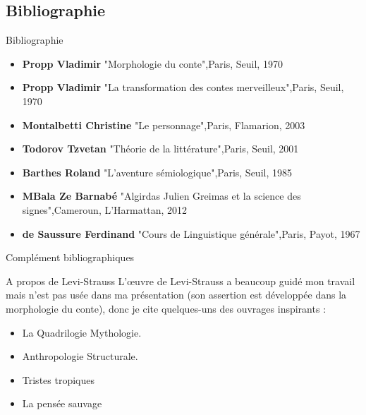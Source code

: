 \documentclass{beamer}
\begin{document}
\subsection{Bibliographie}
\begin{frame}{Bibliographie}
  \scriptsize
  \begin{itemize}
    \item \textbf{Propp Vladimir} "Morphologie du conte",\newline Paris, Seuil, 1970
    \item \textbf{Propp Vladimir} "La transformation des contes merveilleux",\newline Paris, Seuil, 1970
    \item \textbf{Montalbetti Christine} "Le personnage",\newline Paris, Flamarion, 2003
    \item \textbf{Todorov Tzvetan} "Théorie de la littérature",\newline Paris, Seuil, 2001
    \item \textbf{Barthes Roland} "L'aventure sémiologique",\newline Paris, Seuil, 1985
    \item \textbf{MBala Ze Barnabé} "Algirdas Julien Greimas et la science des signes",\newline Cameroun, L'Harmattan, 2012
    \item \textbf{de Saussure Ferdinand} "Cours de Linguistique générale",\newline Paris, Payot, 1967
  \end{itemize}
\end{frame}

\begin{frame}{Complément bibliographiques}
  \begin{block}{A propos de Levi-Strauss}
    L'œuvre de Levi-Strauss a beaucoup guidé mon travail mais n'est pas usée dans ma présentation (son assertion est développée dans la morphologie du conte), donc je cite quelques-uns des ouvrages inspirants : 
    \begin{itemize}
      \item La Quadrilogie Mythologie.
      \item Anthropologie Structurale.
      \item Tristes tropiques
      \item La pensée sauvage
    \end{itemize}
  \end{block}
  
\end{frame}
\end{document}
